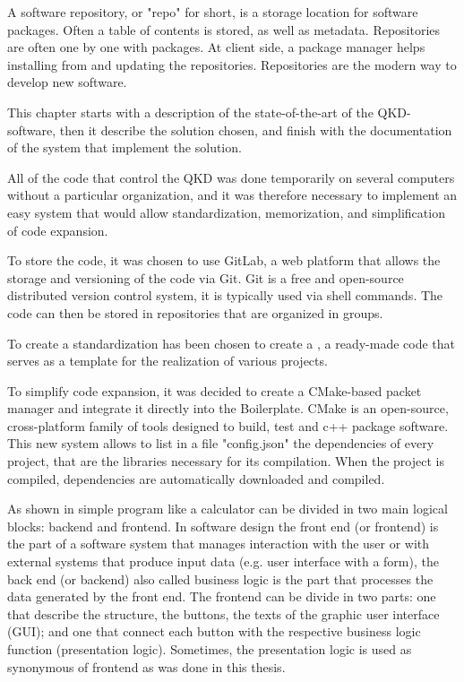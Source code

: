 A software repository, or "repo" for short, is a storage location for software packages. Often a table of contents is stored, as well as metadata. Repositories are often one by one with packages. At client side, a package manager helps installing from and updating the repositories. Repositories are the modern way to develop new software.

This chapter starts with a description of the state-of-the-art of the QKD-software, then it describe the solution chosen, and finish with the documentation of the system that implement the solution.

\newpage

All of the code that control the QKD was done temporarily on several computers without a particular organization, and it was therefore necessary to implement an easy system that would allow standardization, memorization, and simplification of code expansion.

To store the code, it was chosen to use GitLab, a web platform that allows the storage and versioning of the code via Git. Git is a free and open-source distributed version control system, it is typically used via shell commands.
The code can then be stored in repositories that are organized in groups.

To create a standardization has been chosen to create a , a ready-made code that serves as a template for the realization of various projects.

To simplify code expansion, it was decided to create a CMake-based packet manager and integrate it directly into the Boilerplate. CMake is an open-source, cross-platform family of tools designed to build, test and c++ package software.
This new system allows to list in a file "config.json" the dependencies of every project, that are the libraries necessary for its compilation.
When the project is compiled, dependencies are automatically downloaded and compiled.

As shown in  simple program like a calculator can be divided in two main logical blocks: backend and frontend.
In software design the front end (or frontend) is the part of a software system that manages interaction with the user or with external systems that produce input data (e.g. user interface with a form), the back end (or backend) also called business logic is the part that processes the data generated by the front end. The frontend can be divide in two parts: one that describe the structure, the buttons, the texts of the graphic user interface (GUI); and one that connect each button with the respective business logic function (presentation logic). Sometimes, the presentation logic is used as synonymous of frontend as was done in this thesis.

